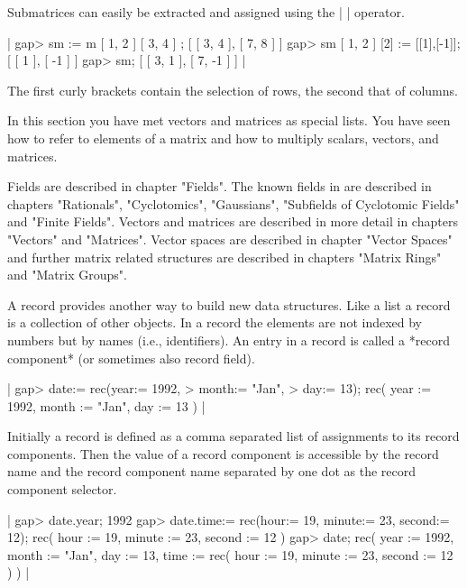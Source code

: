 Submatrices can  easily  be  extracted and  assigned using  the  |{ }{ }|
operator.

|    gap> sm := m{ [ 1, 2 ] }{ [ 3, 4 ] };
    [ [ 3, 4 ], [ 7, 8 ] ]
    gap> sm{ [ 1, 2 ] }{ [2] } := [[1],[-1]];
    [ [ 1 ], [ -1 ] ]
    gap> sm;
    [ [ 3, 1 ], [ 7, -1 ] ] |

The first curly brackets contain the selection of rows, the second that
of columns.

In this section you have met vectors and matrices as  special lists.  You
have seen  how  to refer  to elements of  a  matrix and  how  to multiply
scalars, vectors, and matrices.

Fields are described in chapter "Fields".  The known fields in {\GAP} are
described in chapters "Rationals", "Cyclotomics", "Gaussians", "Subfields
of Cyclotomic  Fields" and "Finite  Fields".  Vectors  and  matrices  are
described in more detail  in  chapters "Vectors"  and "Matrices".  Vector
spaces  are described  in  chapter  "Vector  Spaces" and  further  matrix
related structures are described in  chapters "Matrix Rings"  and "Matrix
Groups".


A record provides another way to  build new data structures.  Like a list
a record is a collection of other  objects.  In a record the elements are
not indexed by numbers but by  names (i.e., identifiers).   An entry in a
record is called a *record component* (or sometimes also record field).

|    gap> date:= rec(year:= 1992,
    >               month:= "Jan",
    >               day:= 13);
    rec(
      year := 1992,
      month := "Jan",
      day := 13 ) |

Initially a record is defined as a comma separated list of assignments to
its  record  components.   Then  the  value  of  a  record  component  is
accessible by the record name  and the record component name separated by
one dot as the record component selector.

|    gap> date.year;
    1992
    gap> date.time:= rec(hour:= 19, minute:= 23, second:= 12);
    rec(
      hour := 19,
      minute := 23,
      second := 12 )
    gap> date;
    rec(
      year := 1992,
      month := "Jan",
      day := 13,
      time := rec(
          hour := 19,
          minute := 23,
          second := 12 ) ) |

